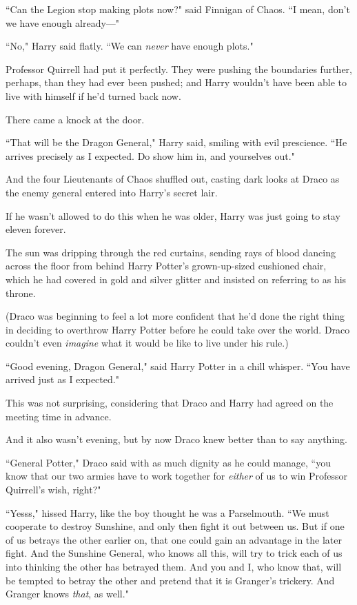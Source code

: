 ``Can the Legion stop making plots now?" said Finnigan of Chaos. ``I mean, don't we have enough already—"

``No," Harry said flatly. ``We can \emph{never} have enough plots."

Professor Quirrell had put it perfectly. They were pushing the boundaries further, perhaps, than they had ever been pushed; and Harry wouldn't have been able to live with himself if he'd turned back now.

There came a knock at the door.

``That will be the Dragon General," Harry said, smiling with evil prescience. ``He arrives precisely as I expected. Do show him in, and yourselves out."

And the four Lieutenants of Chaos shuffled out, casting dark looks at Draco as the enemy general entered into Harry's secret lair.

If he wasn't allowed to do this when he was older, Harry was just going to stay eleven forever.

\later

The sun was dripping through the red curtains, sending rays of blood dancing across the floor from behind Harry Potter's grown-up-sized cushioned chair, which he had covered in gold and silver glitter and insisted on referring to as his throne.

(Draco was beginning to feel a lot more confident that he'd done the right thing in deciding to overthrow Harry Potter before he could take over the world. Draco couldn't even \emph{imagine} what it would be like to live under his rule.)

``Good evening, Dragon General," said Harry Potter in a chill whisper. ``You have arrived just as I expected."

This was not surprising, considering that Draco and Harry had agreed on the meeting time in advance.

And it also wasn't evening, but by now Draco knew better than to say anything.

``General Potter," Draco said with as much dignity as he could manage, ``you know that our two armies have to work together for \emph{either} of us to win Professor Quirrell's wish, right?"

``Yesss," hissed Harry, like the boy thought he was a Parselmouth. ``We must cooperate to destroy Sunshine, and only then fight it out between us. But if one of us betrays the other earlier on, that one could gain an advantage in the later fight. And the Sunshine General, who knows all this, will try to trick each of us into thinking the other has betrayed them. And you and I, who know that, will be tempted to betray the other and pretend that it is Granger's trickery. And Granger knows \emph{that}, as well."

